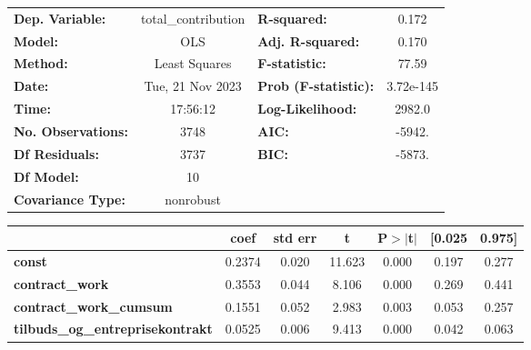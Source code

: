 \begin{center}
\begin{tabular}{lclc}
\toprule
\textbf{Dep. Variable:}                   & total\_contribution & \textbf{  R-squared:         } &     0.172   \\
\textbf{Model:}                           &         OLS         & \textbf{  Adj. R-squared:    } &     0.170   \\
\textbf{Method:}                          &    Least Squares    & \textbf{  F-statistic:       } &     77.59   \\
\textbf{Date:}                            &   Tue, 21 Nov 2023  & \textbf{  Prob (F-statistic):} & 3.72e-145   \\
\textbf{Time:}                            &       17:56:12      & \textbf{  Log-Likelihood:    } &    2982.0   \\
\textbf{No. Observations:}                &          3748       & \textbf{  AIC:               } &    -5942.   \\
\textbf{Df Residuals:}                    &          3737       & \textbf{  BIC:               } &    -5873.   \\
\textbf{Df Model:}                        &            10       & \textbf{                     } &             \\
\textbf{Covariance Type:}                 &      nonrobust      & \textbf{                     } &             \\
\bottomrule
\end{tabular}
\begin{tabular}{lcccccc}
                                          & \textbf{coef} & \textbf{std err} & \textbf{t} & \textbf{P$> |$t$|$} & \textbf{[0.025} & \textbf{0.975]}  \\
\midrule
\textbf{const}                            &       0.2374  &        0.020     &    11.623  &         0.000        &        0.197    &        0.277     \\
\textbf{contract\_work}                   &       0.3553  &        0.044     &     8.106  &         0.000        &        0.269    &        0.441     \\
\textbf{contract\_work\_cumsum}           &       0.1551  &        0.052     &     2.983  &         0.003        &        0.053    &        0.257     \\
\textbf{tilbuds\_og\_entreprisekontrakt}  &       0.0525  &        0.006     &     9.413  &         0.000        &        0.042    &        0.063     \\

\end{tabular}
\end{center}
